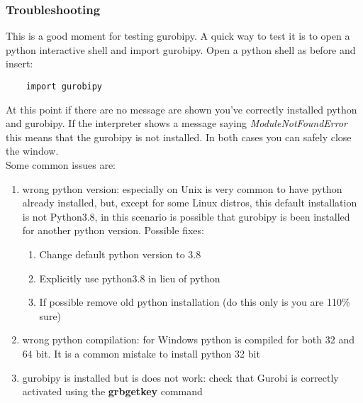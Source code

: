             \subsubsection{Troubleshooting}
                This is a good moment for testing gurobipy. A quick way to test it is to open a python interactive shell and import gurobipy. Open a python shell as before and 
                insert:
                \begin{lstlisting}
    import gurobipy
                \end{lstlisting}
                At this point if there are no message are shown you've correctly installed python and gurobipy. If the interpreter shows a message saying \emph{ModuleNotFoundError}
                this means that the gurobipy is not installed. In both cases you can safely close the window.\\ Some common issues are:
                \begin{enumerate}
                    \item wrong python version: especially on Unix is very common to have python already installed, but, except for some Linux distros, this default installation is not Python3.8,
                    in this scenario is possible that gurobipy is been installed for another python version. Possible fixes:
                    \begin{enumerate}
                        \item Change default python version to 3.8
                        \item Explicitly use python3.8 in lieu of python 
                        \item If possible remove old python installation (do this only is you are 110\% sure)
                    \end{enumerate}
                    \item wrong python compilation: for Windows python is compiled for both 32 and 64 bit. It is a common mistake to install python 32 bit
                    \item gurobipy is installed but is does not work: check that Gurobi is correctly activated using the \textbf{grbgetkey} command\
                \end{enumerate}
